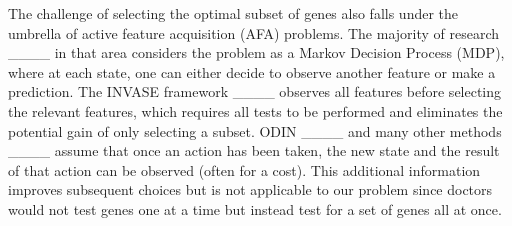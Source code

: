 The challenge of selecting the optimal subset of genes also falls under the umbrella of active feature acquisition (AFA) problems. The majority of research ____ in that area considers the problem as a Markov Decision Process (MDP), where at each state, one can either decide to observe another feature or make a prediction. The INVASE framework ____ observes all features before selecting the relevant features, which requires all tests to be performed and eliminates the potential gain of only selecting a subset. ODIN ____ and many other methods ____ assume that once an action has been taken, the new state and the result of that action can be observed (often for a cost). This additional information improves subsequent choices but is not applicable to our problem since doctors would not test genes one at a time but instead test for a set of genes all at once.